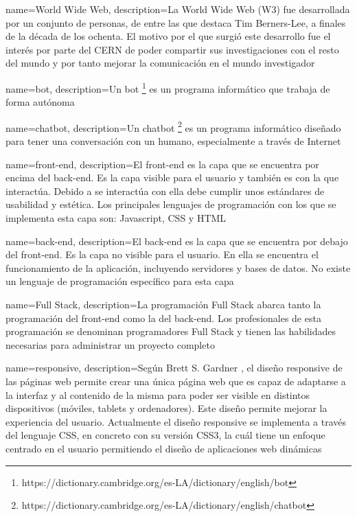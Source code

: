 
\makeglossaries


{
    name=World Wide Web,
    description={La World Wide Web (W3) fue desarrollada por un conjunto de personas, de entre las que destaca Tim Berners-Lee, a finales de la década de los ochenta. El motivo por el que surgió este desarrollo fue el interés por parte del CERN de poder compartir sus investigaciones con el resto del mundo y por tanto mejorar la comunicación en el mundo investigador}
}

{
    name=bot,
    description={Un bot \footnote{https://dictionary.cambridge.org/es-LA/dictionary/english/bot} es un programa informático que trabaja de forma autónoma}
}

{
    name=chatbot,
    description={Un chatbot \footnote{https://dictionary.cambridge.org/es-LA/dictionary/english/chatbot} es un programa informático diseñado para tener una conversación con un humano, especialmente a través de Internet}
}

{
    name=front-end,
    description={El front-end es la capa que se encuentra por encima del \gls{back-end}. Es la capa visible para el usuario y también es con la que interactúa. Debido a se interactúa con ella debe cumplir unos estándares de usabilidad y estética. Los principales lenguajes de programación con los que se implementa esta capa son: Javascript, CSS y HTML}
}

{
    name=back-end,
    description={El back-end es la capa que se encuentra por debajo del \gls{front-end}. Es la capa no visible para el usuario. En ella se encuentra el funcionamiento de la aplicación, incluyendo servidores y bases de datos. No existe un lenguaje de programación específico para esta capa}
}

{
    name=Full Stack,
    description={La programación Full Stack abarca tanto la programación del \gls{front-end} como la del \gls{back-end}. Los profesionales de esta programación se denominan programadores Full Stack y tienen las habilidades necesarias para administrar un proyecto completo}
}

{
    name=responsive,
    description={Según Brett S. Gardner \cite{RefWorks:RefID:34-2011responsive}, el diseño responsive de las páginas web permite crear una única página web que es capaz de adaptarse a la interfaz y al contenido de la misma para poder ser visible en distintos dispositivos (móviles, tablets y ordenadores). Este diseño permite mejorar la experiencia del usuario. Actualmente el diseño responsive se implementa a través del lenguaje CSS, en concreto con su versión CSS3, la cuál tiene un enfoque centrado en el usuario permitiendo el diseño de aplicaciones web dinámicas}
}

